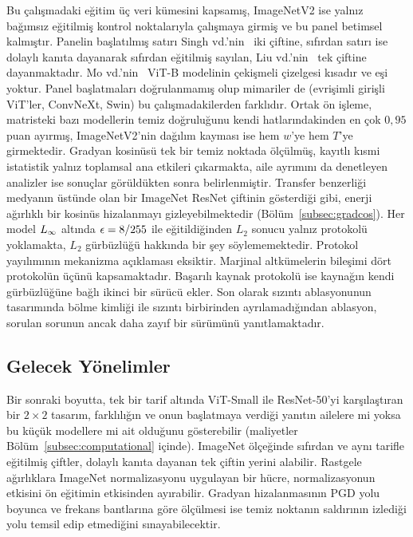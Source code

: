 Bu çalışmadaki eğitim üç veri kümesini kapsamış, ImageNetV2 ise yalnız bağımsız eğitilmiş kontrol noktalarıyla çalışmaya girmiş ve bu panel betimsel kalmıştır. Panelin başlatılmış satırı Singh vd.'nin~\cite{singh2023revisiting} iki çiftine, sıfırdan satırı ise dolaylı kanıta dayanarak sıfırdan eğitilmiş sayılan, Liu vd.'nin~\cite{liu2023comprehensive} tek çiftine dayanmaktadır. Mo vd.'nin~\cite{mo2022adversarial} ViT-B modelinin çekişmeli çizelgesi kısadır ve eşi yoktur. Panel başlatmaları doğrulanmamış olup mimariler de (evrişimli girişli ViT'ler, ConvNeXt, Swin) bu çalışmadakilerden farklıdır. Ortak ön işleme, matristeki bazı modellerin temiz doğruluğunu kendi hatlarındakinden en çok $0{,}95$ puan ayırmış, ImageNetV2'nin dağılım kayması ise hem $w$'ye hem $T$'ye girmektedir. Gradyan kosinüsü tek bir temiz noktada ölçülmüş, kayıtlı kısmi istatistik yalnız toplamsal ana etkileri çıkarmakta, aile ayrımını da denetleyen analizler ise sonuçlar görüldükten sonra belirlenmiştir. Transfer benzerliği medyanın üstünde olan bir ImageNet ResNet çiftinin gösterdiği gibi, enerji ağırlıklı bir kosinüs hizalanmayı gizleyebilmektedir (Bölüm~\ref{subsec:gradcos}). Her model $L_\infty$ altında $\epsilon = 8/255$ ile eğitildiğinden $L_2$ sonucu yalnız protokolü yoklamakta, $L_2$ gürbüzlüğü hakkında bir şey söylememektedir. Protokol yayılımının mekanizma açıklaması eksiktir. Marjinal altkümelerin bileşimi dört protokolün üçünü kapsamaktadır. Başarılı kaynak protokolü ise kaynağın kendi gürbüzlüğüne bağlı ikinci bir sürücü ekler. Son olarak sızıntı ablasyonunun tasarımında bölme kimliği ile sızıntı birbirinden ayrılamadığından ablasyon, sorulan sorunun ancak daha zayıf bir sürümünü yanıtlamaktadır.

\subsection{Gelecek Yönelimler}
\label{subsec:future}

Bir sonraki boyutta, tek bir tarif altında ViT-Small ile ResNet-50'yi karşılaştıran bir $2\times2$ tasarım, farklılığın ve onun başlatmaya verdiği yanıtın ailelere mi yoksa bu küçük modellere mi ait olduğunu gösterebilir (maliyetler Bölüm~\ref{subsec:computational} içinde). ImageNet ölçeğinde sıfırdan ve aynı tarifle eğitilmiş çiftler, dolaylı kanıta dayanan tek çiftin yerini alabilir. Rastgele ağırlıklara ImageNet normalizasyonu uygulayan bir hücre, normalizasyonun etkisini ön eğitimin etkisinden ayırabilir. Gradyan hizalanmasının PGD yolu boyunca ve frekans bantlarına göre ölçülmesi ise temiz noktanın saldırının izlediği yolu temsil edip etmediğini sınayabilecektir.

